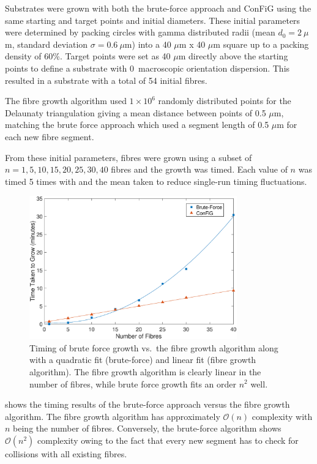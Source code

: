 Substrates were grown with both the brute-force approach and ConFiG using the same starting and target points and initial diameters.
These initial parameters were determined by packing circles with gamma distributed radii (mean $d_0 = 2\ \mu$m, standard deviation $\sigma = 0.6\ \mu$m) into a 40 $\mu$m x 40 $\mu$m square up to a packing density of 60\%. Target points were set as 40 $\mu$m directly above the starting points to define a substrate with 0\degree\ macroscopic orientation dispersion.
This resulted in a substrate with a total of 54 initial fibres.

The fibre growth algorithm used $1\times 10^6$ randomly distributed points for the Delaunaty triangulation giving a mean distance between points of 0.5 $\mu$m, matching the brute force approach which used a segment length of 0.5 $\mu$m for each new fibre segment.

From these initial parameters, fibres were grown using a subset of $n = 1, 5, 10, 15, 20, 25, 30, 40$ fibres and the growth was timed. Each value of $n$ was timed 5 times with and the mean taken to reduce single-run timing fluctuations.

\begin{figure}[t]
  \centering
  \includegraphics[width=0.8\textwidth]{figures/ipmi_implementation/brute_force_vs_algo_2.eps}
  \caption{\small Timing of brute force growth vs.\ the fibre growth algorithm along with a quadratic fit (brute-force) and linear fit (fibre growth algorithm). The fibre growth algorithm is clearly linear in the number of fibres, while brute force growth fits an order $n^2$ well. }
  \label{fig:impi_brute_force}
\end{figure}

 shows the timing results of the brute-force approach versus the fibre growth algorithm.
The fibre growth algorithm  has approximately $\mathcal{O}(n)$ complexity with $n$ being the number of fibres.
Conversely, the brute-force algorithm shows $\mathcal{O}(n^2)$ complexity owing to the fact that every new segment has to check for collisions with all existing fibres.

